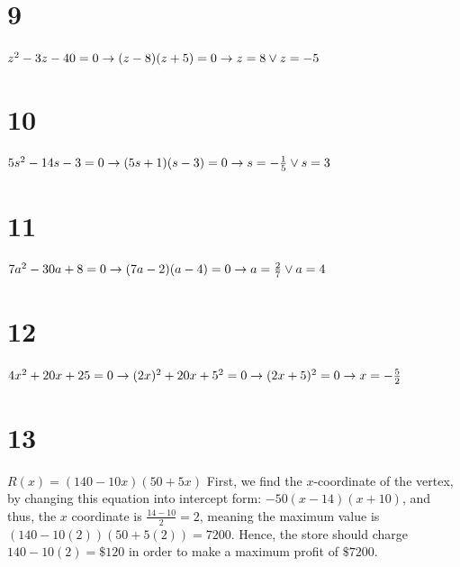 \documentclass{article}
\theoremstyle{definition}
\begin{document}
\section*{9}
$z^2-3z-40=0\newline\rightarrow (z-8)(z+5)=0\newline\rightarrow z=8\vee z=-5$

\section*{10}
$5s^2-14s-3=0\newline\rightarrow (5s+1)(s-3)=0\newline\rightarrow s=-\frac{1}{5}\vee s=3$

\section*{11}
$7a^2-30a+8=0\newline\rightarrow (7a-2)(a-4)=0\newline\rightarrow a=\frac{2}{7}\vee a=4$

\section*{12}
$4x^2+20x+25=0\newline\rightarrow (2x)^2+20x+5^2=0\newline\rightarrow (2x+5)^2=0\newline\rightarrow x=-\frac{5}{2}$

\section*{13}
$R(x)=(140-10x)(50+5x)$ First, we find the $x$-coordinate of the vertex, by changing this equation into intercept form:\newline
$-50(x-14)(x+10)$, and thus, the $x$ coordinate is $\frac{14-10}{2}=2$, meaning the maximum value is $(140-10(2))(50+5(2))=7200$. Hence, 
the store should charge $140-10(2)=\$120$ in order to make a maximum profit of $\$7200$.
\end{document}
